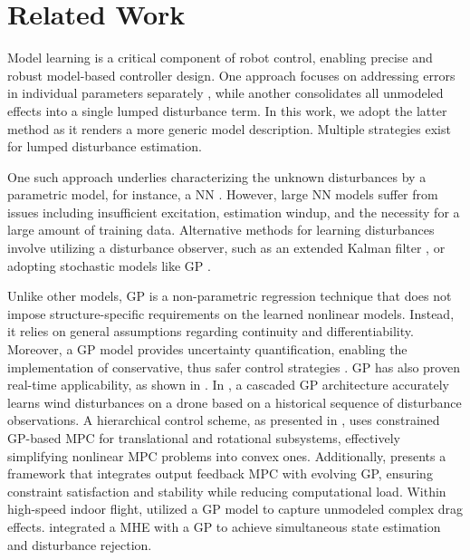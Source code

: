 \section{Related Work}
\label{sec:related_work}

Model learning is a critical component of robot control, enabling precise and robust model-based controller design. One approach focuses on addressing errors in individual parameters separately \cite{aero, madebo2024robust, tiltrotor}, while another consolidates all unmodeled effects into a single lumped disturbance term.
In this work, we adopt the latter method as it renders a more generic model description. Multiple strategies exist for lumped disturbance estimation. 

One such approach underlies characterizing the unknown disturbances by a parametric model, for instance, a \ac{NN} \cite{salzmann2023real, neural-fly}. However, large \ac{NN} models suffer from issues including insufficient excitation, estimation windup, and the necessity for a large amount of training data. Alternative methods for learning disturbances involve utilizing a disturbance observer, such as an extended Kalman filter \cite{rov_ekf2}, or adopting stochastic models like \ac{GP} \cite{bionic_gp}.

Unlike other models, \ac{GP} is a non-parametric regression technique that does not impose structure-specific requirements on the learned nonlinear models. Instead, it relies on general assumptions regarding continuity and differentiability. Moreover, a \ac{GP} model provides uncertainty quantification, enabling the implementation of conservative, thus safer control strategies \cite{cautious_mpc, prajapat2024safe}. \ac{GP} has also proven real-time applicability, as shown in \cite{real-gp-mpc, wono1}. In \cite{mohit_gp}, a cascaded GP architecture accurately learns wind disturbances on a drone based on a historical sequence of disturbance observations. A hierarchical control scheme, as presented in \cite{cao2017gaussian}, uses constrained \ac{GP}-based \ac{MPC} for translational and rotational subsystems, effectively simplifying nonlinear \ac{MPC} problems into convex ones. Additionally, \cite{maiworm2021online} presents a framework that integrates output feedback \ac{MPC} with evolving \ac{GP}, ensuring constraint satisfaction and stability while reducing computational load. Within high-speed indoor flight, \cite{data_driven_mpc} utilized a \ac{GP} model to capture unmodeled complex drag effects. \cite{wono2}  integrated a \ac{MHE} with a \ac{GP} to achieve simultaneous state estimation and disturbance rejection. 

